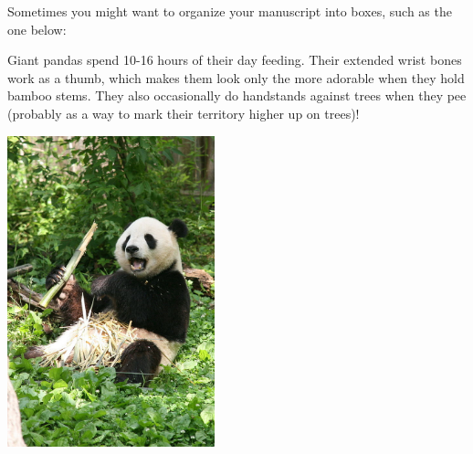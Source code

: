 \documentclass[12pt]{article}
\begin{document}
Sometimes you might want to organize your manuscript into boxes, such
as the one below:

\vspace{0.5cm}

\begin{tcolorbox}[breakable, width=\textwidth, colback=gray!10, boxrule=0pt,
  title=Box 1: A photo of the greatest animal, fonttitle=\bfseries]
  \small

  Giant pandas spend 10-16 hours of their day feeding.
  Their extended wrist bones work as a thumb, which makes them look
  only the more adorable when they hold bamboo stems.
  They also occasionally do handstands against trees when they pee
  (probably as a way to mark their territory higher up on trees)!

  \begin{center}
    \includegraphics[width=6cm]{figs/pandaadult.jpg}
    \label{fig:panda2}
  \end{center}
    
\end{tcolorbox}
\end{document}
